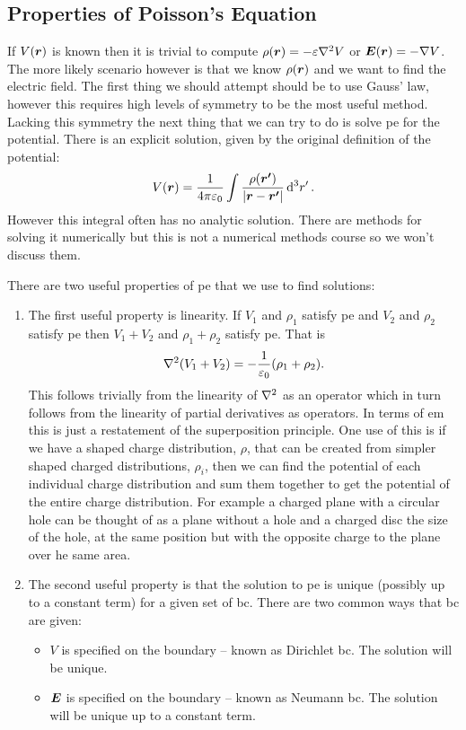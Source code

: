     \subsection{Properties of Poisson's Equation}
    If \(V(\bm{r})\) is known then it is trivial to compute \(\rho(\bm{r}) = -\varepsilon\nabla^2 V\) or \(\bm{E}(\bm{r}) = -\nabla V\).
    The more likely scenario however is that we know \(\rho(\bm{r})\) and we want to find the electric field.
    The first thing we should attempt should be to use Gauss' law, however this requires high levels of symmetry to be the most useful method.
    Lacking this symmetry the next thing that we can try to do is solve \acrshort{pe} for the potential.
    There is an explicit solution, given by the original definition of the potential:
    \[V(\bm{r}) = \frac{1}{4\pi\varepsilon_0}\int\frac{\rho(\bm{r'})}{\abs{\bm{r} - \bm{r'}}}\dd[3]{r'}.\]
    However this integral often has no analytic solution.
    There are methods for solving it numerically but this is not a numerical methods course so we won't discuss them.
    
    There are two useful properties of \acrshort{pe} that we use to find solutions:
    \begin{enumerate}
        \item The first useful property is linearity.
        If \(V_1\) and \(\rho_1\) satisfy \acrshort{pe} and \(V_2\) and \(\rho_2\) satisfy \acrshort{pe} then \(V_1 + V_2\) and \(\rho_1 + \rho_2\) satisfy \acrshort{pe}.
        That is
        \[\nabla^2(V_1 + V_2) = -\frac{1}{\varepsilon_0}(\rho_1 + \rho_2).\]
        This follows trivially from the linearity of \(\nabla^2\) as an operator which in turn follows from the linearity of partial derivatives as operators.
        In terms of \acrshort{em} this is just a restatement of the superposition principle.
        One use of this is if we have a shaped charge distribution, \(\rho\), that can be created from simpler shaped charged distributions, \(\rho_i\), then we can find the potential of each individual charge distribution and sum them together to get the potential of the entire charge distribution.
        For example a charged plane with a circular hole can be thought of as a plane without a hole and a charged disc the size of the hole, at the same position but with the opposite charge to the plane over he same area.
        
        \item The second useful property is that the solution to \acrshort{pe} is unique (possibly up to a constant term) for a given set of \acrshort{bc}.
        There are two common ways that \acrshort{bc} are given:
        \begin{itemize}
            \item \(V\) is specified on the boundary -- known as Dirichlet \acrshort{bc}.
            The solution will be unique.
            \item \(\bm{E}\) is specified on the boundary -- known as Neumann \acrshort{bc}.
            The solution will be unique up to a constant term.
        \end{itemize}
    \end{enumerate}
    

